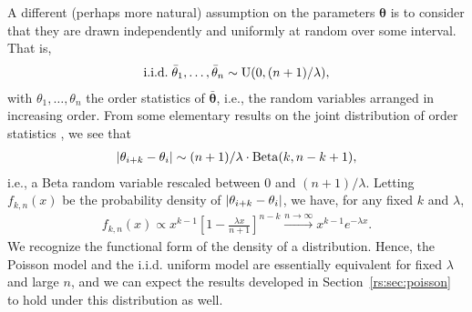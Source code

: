 A different (perhaps more natural) assumption on the parameters $\bm{\theta}$ is to consider that they are drawn independently and uniformly at random over some interval.
That is,
\begin{align*}
\text{i.i.d.}\; \bar{\theta}_1, \ldots, \bar{\theta}_n \sim \mathrm{U}( 0, (n+1) / \lambda ),
\end{align*}
with $\theta_1, \ldots, \theta_n$ the order statistics of $\bar{\bm{\theta}}$, i.e., the random variables arranged in increasing order.
From some elementary results on the joint distribution of order statistics \citep[see, e.g.,][]{arnold2008first}, we see that
\begin{align*}
\lvert \theta_{i+k} - \theta_{i} \rvert \sim (n+1) / \lambda \cdot \mathrm{Beta}( k, n - k + 1 ),
\end{align*}
i.e., a Beta random variable rescaled between $0$ and $(n+1) / \lambda$.
Letting $f_{k,n}(x)$ be the probability density of $\lvert \theta_{i+k} - \theta_{i} \rvert$, we have, for any fixed $k$ and $\lambda$,
\begin{align*}
f_{k,n}(x) \propto x^{k-1} \left[ 1 - \frac{\lambda x}{n + 1} \right]^{n - k} \xrightarrow{n \to \infty} x^{k-1} e^{-\lambda x}.
\end{align*}
We recognize the functional form of the density of a  distribution.
Hence, the Poisson model and the i.i.d. uniform model are essentially equivalent for fixed $\lambda$ and large $n$, and we can expect the results developed in Section~\ref{rs:sec:poisson} to hold under this distribution as well.
